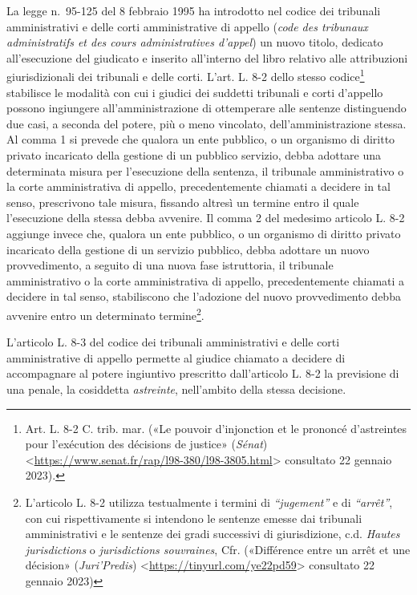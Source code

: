 \documentclass[12pt,it,a4paper,]{report}
\begin{document}
La legge n.~95-125 del 8 febbraio 1995 ha introdotto nel codice dei
tribunali amministrativi e delle corti amministrative di appello
(\emph{code des tribunaux administratifs et des cours administratives
d'appel}) un nuovo titolo, dedicato all'esecuzione del giudicato e
inserito all'interno del libro relativo alle attribuzioni
giurisdizionali dei tribunali e delle corti. L'art. L. 8-2 dello stesso
codice\footnote{Art. L. 8-2 C. trib. mar. ({«Le pouvoir d'injonction et
  le prononcé d'astreintes pour l'exécution des décisions de justice»}
  (\emph{Sénat})
  \textless{}\url{https://www.senat.fr/rap/l98-380/l98-3805.html}\textgreater{}
  consultato 22 gennaio 2023).} stabilisce le modalità con cui i giudici
dei suddetti tribunali e corti d'appello possono ingiungere
all'amministrazione di ottemperare alle sentenze distinguendo due casi,
a seconda del potere, più o meno vincolato, dell'amministrazione stessa.
Al comma 1 si prevede che qualora un ente pubblico, o un organismo di
diritto privato incaricato della gestione di un pubblico servizio, debba
adottare una determinata misura per l'esecuzione della sentenza, il
tribunale amministrativo o la corte amministrativa di appello,
precedentemente chiamati a decidere in tal senso, prescrivono tale
misura, fissando altresì un termine entro il quale l'esecuzione della
stessa debba avvenire. Il comma 2 del medesimo articolo L. 8-2 aggiunge
invece che, qualora un ente pubblico, o un organismo di diritto privato
incaricato della gestione di un servizio pubblico, debba adottare un
nuovo provvedimento, a seguito di una nuova fase istruttoria, il
tribunale amministrativo o la corte amministrativa di appello,
precedentemente chiamati a decidere in tal senso, stabiliscono che
l'adozione del nuovo provvedimento debba avvenire entro un determinato
termine\footnote{L'articolo L. 8-2 utilizza testualmente i termini di
  \emph{``jugement''} e di \emph{``arrêt''}, con cui rispettivamente si
  intendono le sentenze emesse dai tribunali amministrativi e le
  sentenze dei gradi successivi di giurisdizione, c.d. \emph{Hautes
  jurisdictions} o \emph{jurisdictions souvraines}, Cfr. ({«Différence
  entre un arrêt et une décision»} (\emph{Juri'Predis})
  \textless{}\url{https://tinyurl.com/ye22pd59}\textgreater{} consultato
  22 gennaio 2023)}.

L'articolo L. 8-3 del codice dei tribunali amministrativi e delle corti
amministrative di appello permette al giudice chiamato a decidere di
accompagnare al potere ingiuntivo prescritto dall'articolo L. 8-2 la
previsione di una penale, la cosiddetta \emph{astreinte}, nell'ambito
della stessa decisione.
\end{document}
